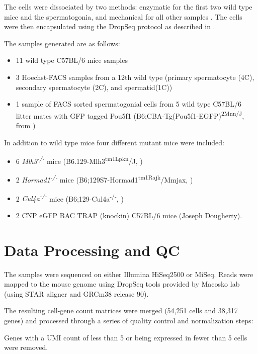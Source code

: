 The cells were dissociated by two methods: enzymatic for the first two wild type mice and the spermatogonia, and mechanical for all other samples \parencite{Lima2017Standardized,Jung2019Unified}. The cells were then encapsulated using the DropSeq protocol \parencite{Macosko2015Highly} as described in \cite{Jung2019Unified}. 

The samples generated are as follows:

\begin{itemize}
	\item 11 wild type C57BL/6 mice samples
	\item 3 Hoechst-FACS samples from a 12th wild type (primary spermatocyte (4C), secondary spermatocyte (2C), and spermatid(1C))
	\item 1 sample of FACS sorted spermatogonial cells from 5 wild type C57BL/6 litter mates with GFP tagged Pou5f1 (B6;CBA-Tg(Pou5f1-EGFP)\textsuperscript{2Mnn/J}, from \cite{Szabo2002Allelespecific})
\end{itemize}

In addition to wild type mice four different mutant mice were included:
\begin{itemize}
	\item 6 \textit{Mlh3\textsuperscript{-/-}} mice (B6.129-Mlh3\textsuperscript{tm1Lpkn}/J, \cite{Lipkin2002Meiotic})
	\item 2 \textit{Hormad1\textsuperscript{-/-}} mice (B6;129S7-Hormad1\textsuperscript{tm1Rajk}/Mmjax, \cite{Shin2010Hormad1})
	\item 2 \textit{Cul4a\textsuperscript{-/-}} mice (B6;129-Cul4a\textsuperscript{-/-}, \cite{Yin2011E3})
	\item 2 CNP eGFP BAC TRAP (knockin) C57BL/6 mice (Joseph Dougherty).
\end{itemize}


\section{Data Processing and QC}

The samples were sequenced on either Illumina HiSeq2500 or MiSeq. Reads were mapped to the mouse genome using DropSeq tools provided by Macosko lab (using STAR aligner and GRCm38 release 90).

The resulting cell-gene count matrices were merged (54,251 cells and 38,317 genes) and processed through a series of quality control and normalization steps:

Genes with a UMI count of less than 5 or being expressed in fewer than 5 cells were removed.

